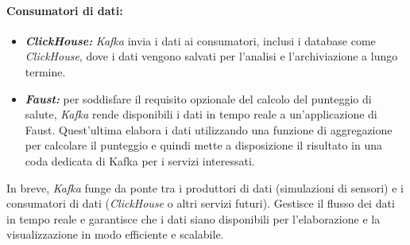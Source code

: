 \paragraph*{Consumatori di dati:}
\begin{itemize}
  \item \textbf{\textit{ClickHouse:}} \textit{Kafka} invia  i dati ai consumatori, inclusi i database come \textit{ClickHouse}, dove i dati vengono salvati per l'analisi e l'archiviazione a lungo termine.
  \item \textbf{\textit{Faust:}} per soddisfare il requisito opzionale del calcolo del punteggio di salute, \textit{Kafka} rende disponibili i dati in tempo reale a un'applicazione di Faust. Quest'ultima elabora i dati utilizzando una funzione di aggregazione per calcolare il punteggio e quindi mette a disposizione il risultato in una coda dedicata di Kafka per i servizi interessati.
\end{itemize}

In breve, \textit{Kafka} funge da ponte tra i produttori di dati (simulazioni di sensori) e i consumatori di dati (\textit{ClickHouse} o altri servizi futuri). Gestisce il flusso dei dati in tempo reale e garantisce che i dati siano disponibili per l'elaborazione e la visualizzazione in modo efficiente e scalabile.